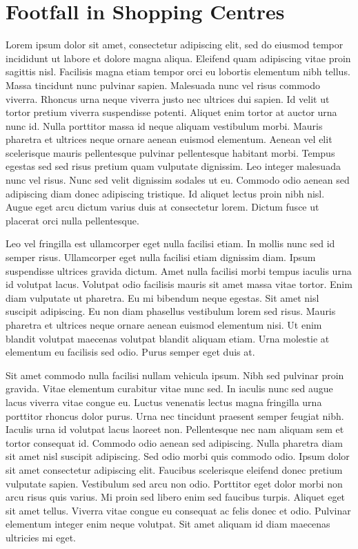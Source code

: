 \section{Footfall in Shopping Centres}
Lorem ipsum dolor sit amet, consectetur adipiscing elit, sed do eiusmod tempor incididunt ut labore et dolore magna aliqua. Eleifend quam adipiscing vitae proin sagittis nisl. Facilisis magna etiam tempor orci eu lobortis elementum nibh tellus. Massa tincidunt nunc pulvinar sapien. Malesuada nunc vel risus commodo viverra. Rhoncus urna neque viverra justo nec ultrices dui sapien. Id velit ut tortor pretium viverra suspendisse potenti. Aliquet enim tortor at auctor urna nunc id. Nulla porttitor massa id neque aliquam vestibulum morbi. Mauris pharetra et ultrices neque ornare aenean euismod elementum. Aenean vel elit scelerisque mauris pellentesque pulvinar pellentesque habitant morbi. Tempus egestas sed sed risus pretium quam vulputate dignissim. Leo integer malesuada nunc vel risus. Nunc sed velit dignissim sodales ut eu. Commodo odio aenean sed adipiscing diam donec adipiscing tristique. Id aliquet lectus proin nibh nisl. Augue eget arcu dictum varius duis at consectetur lorem. Dictum fusce ut placerat orci nulla pellentesque.

Leo vel fringilla est ullamcorper eget nulla facilisi etiam. In mollis nunc sed id semper risus. Ullamcorper eget nulla facilisi etiam dignissim diam. Ipsum suspendisse ultrices gravida dictum. Amet nulla facilisi morbi tempus iaculis urna id volutpat lacus. Volutpat odio facilisis mauris sit amet massa vitae tortor. Enim diam vulputate ut pharetra. Eu mi bibendum neque egestas. Sit amet nisl suscipit adipiscing. Eu non diam phasellus vestibulum lorem sed risus. Mauris pharetra et ultrices neque ornare aenean euismod elementum nisi. Ut enim blandit volutpat maecenas volutpat blandit aliquam etiam. Urna molestie at elementum eu facilisis sed odio. Purus semper eget duis at.

Sit amet commodo nulla facilisi nullam vehicula ipsum. Nibh sed pulvinar proin gravida. Vitae elementum curabitur vitae nunc sed. In iaculis nunc sed augue lacus viverra vitae congue eu. Luctus venenatis lectus magna fringilla urna porttitor rhoncus dolor purus. Urna nec tincidunt praesent semper feugiat nibh. Iaculis urna id volutpat lacus laoreet non. Pellentesque nec nam aliquam sem et tortor consequat id. Commodo odio aenean sed adipiscing. Nulla pharetra diam sit amet nisl suscipit adipiscing. Sed odio morbi quis commodo odio. Ipsum dolor sit amet consectetur adipiscing elit. Faucibus scelerisque eleifend donec pretium vulputate sapien. Vestibulum sed arcu non odio. Porttitor eget dolor morbi non arcu risus quis varius. Mi proin sed libero enim sed faucibus turpis. Aliquet eget sit amet tellus. Viverra vitae congue eu consequat ac felis donec et odio. Pulvinar elementum integer enim neque volutpat. Sit amet aliquam id diam maecenas ultricies mi eget.

